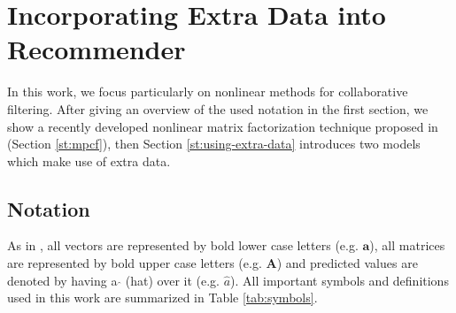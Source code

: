 \chapter{Incorporating Extra Data into Recommender}
\label{c:incorporating-extra-data}


\newcommand{\norm}[1]{\ensuremath{\lVert{#1}\rVert}}
\newcommand{\Abf}[1]{\ensuremath{\mathbf{#1}}}

In this work, we focus particularly on nonlinear methods for collaborative filtering.
After giving an overview of the used notation in the first section, we show a recently developed nonlinear matrix factorization technique proposed in \cite{Kabbur2015} (Section \ref{st:mpcf}), then Section \ref{st:using-extra-data} introduces two models which make use of extra data.


\section{Notation}
\label{st:notation}

As in \cite{Kabbur2015}, all vectors are represented by bold lower case letters (e.g. $\Abf{a}$), all matrices are represented by bold upper case letters (e.g. $\Abf{A}$) and predicted values are denoted by having a $\hat{}$ (hat) over it (e.g. $\hat{a}$).
All important symbols and definitions used in this work are summarized in Table \ref{tab:symbols}.

